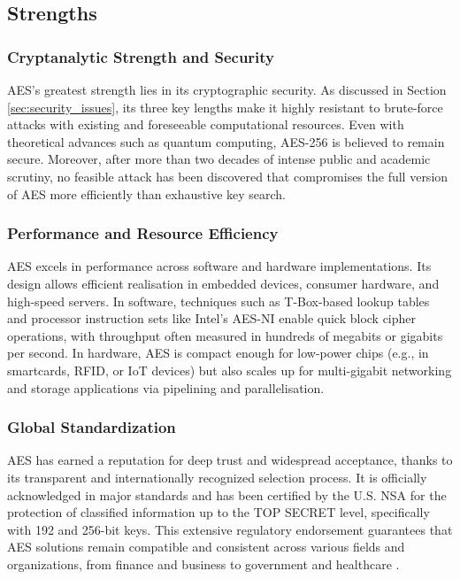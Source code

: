 \subsection{Strengths}

\subsubsection*{Cryptanalytic Strength and Security}

AES's greatest strength lies in its cryptographic security. As discussed in Section \ref{sec:security_issues}, its three key lengths make it highly resistant 
to brute-force attacks with existing and foreseeable computational resources. Even with theoretical advances such as quantum computing, 
AES-256 is believed to remain secure. Moreover, after more than two decades of intense public and academic scrutiny, no feasible attack 
has been discovered that compromises the full version of AES more efficiently than exhaustive key search.

\subsubsection*{Performance and Resource Efficiency}

AES excels in performance across software and hardware implementations. Its design allows efficient realisation in embedded devices, 
consumer hardware, and high-speed servers. In software, techniques such as T-Box-based lookup tables and processor instruction sets 
like Intel's AES-NI enable quick block cipher operations, with throughput often measured in hundreds of megabits or gigabits per second. 
In hardware, AES is compact enough for low-power chips (e.g., in smartcards, \Gls{RFID}, or \Gls{IoT} devices) but also scales up for multi-gigabit 
networking and storage applications via pipelining and parallelisation.

\subsubsection*{Global Standardization}

AES has earned a reputation for deep trust and widespread acceptance, thanks to its transparent and internationally recognized selection 
process. It is officially acknowledged in major standards and has been certified by the U.S. NSA for the protection of classified information 
up to the TOP SECRET level, specifically with 192 and 256-bit keys. This extensive regulatory endorsement guarantees that AES solutions remain 
compatible and consistent across various fields and organizations, from finance and business to government and healthcare \cite{cooper2025aes}.
